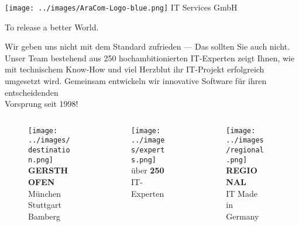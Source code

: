 \documentclass[aspectratio=169]{beamer}
\begin{document}
\begin{frame}{\texttt{[image: ../images/AraCom-Logo-blue.png]} IT Services GmbH}

  {\LARGE To release a better World.}

  {\normalsize
    Wir geben uns nicht mit dem Standard zufrieden --- Das sollten Sie auch nicht.\\
    Unser Team bestehend aus 250 hochambitionierten IT-Experten zeigt Ihnen, wie mit technischem Know-How und viel Herzblut ihr IT-Projekt erfolgreich umgesetzt wird. Gemeinsam entwickeln wir innovative Software für ihren entscheidenden \\
    Vorsprung seit 1998!
  }

  {\footnotesize
    \begin{columns}
      \begin{column}{0.20\textwidth}
        \begin{figure}
          \centering
          \texttt{[image: ../images/destination.png]}\\
          \textbf{GERSTHOFEN}\\
          München \\
          Stuttgart\\
          Bamberg
        \end{figure}
      \end{column}
      \begin{column}{0.20\textwidth}
        \begin{figure}
          \centering
          \texttt{[image: ../images/experts.png]}\\
          über \textbf{250}\\ IT-Experten%
          \newline\newline
        \end{figure}
      \end{column}
      \begin{column}{0.20\textwidth}
        \begin{figure}
          \centering
          \texttt{[image: ../images/regional.png]}\\
          \textbf{REGIONAL}\\ IT Made in Germany\newline
        \end{figure}
      \end{column}
      \begin{column}{0.20\textwidth}

\end{column}
\end{columns}}
\end{frame}
\end{document}
